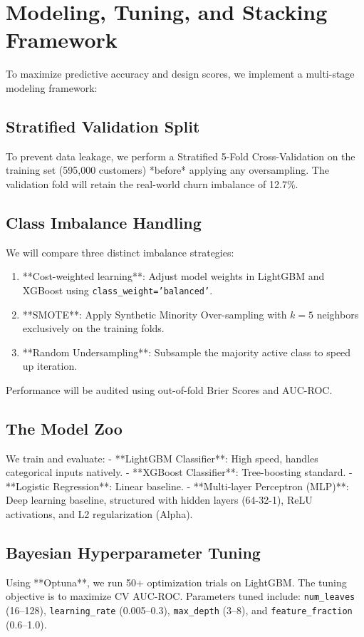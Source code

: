 \documentclass[11pt,a4paper]{article}
\begin{document}
\section{Modeling, Tuning, and Stacking Framework}
To maximize predictive accuracy and design scores, we implement a multi-stage modeling framework:

\subsection{Stratified Validation Split}
To prevent data leakage, we perform a Stratified 5-Fold Cross-Validation on the training set (595,000 customers) *before* applying any oversampling. The validation fold will retain the real-world churn imbalance of 12.7\%.

\subsection{Class Imbalance Handling}
We will compare three distinct imbalance strategies:
\begin{enumerate}
    \item **Cost-weighted learning**: Adjust model weights in LightGBM and XGBoost using \texttt{class\_weight='balanced'}.
    \item **SMOTE**: Apply Synthetic Minority Over-sampling with $k=5$ neighbors exclusively on the training folds.
    \item **Random Undersampling**: Subsample the majority active class to speed up iteration.
\end{enumerate}
Performance will be audited using out-of-fold Brier Scores and AUC-ROC.

\subsection{The Model Zoo}
We train and evaluate:
- **LightGBM Classifier**: High speed, handles categorical inputs natively.
- **XGBoost Classifier**: Tree-boosting standard.
- **Logistic Regression**: Linear baseline.
- **Multi-layer Perceptron (MLP)**: Deep learning baseline, structured with hidden layers (64-32-1), ReLU activations, and L2 regularization (Alpha).

\subsection{Bayesian Hyperparameter Tuning}
Using **Optuna**, we run 50+ optimization trials on LightGBM. The tuning objective is to maximize CV AUC-ROC. Parameters tuned include: \texttt{num\_leaves} (16–128), \texttt{learning\_rate} (0.005–0.3), \texttt{max\_depth} (3–8), and \texttt{feature\_fraction} (0.6–1.0).
\end{document}
